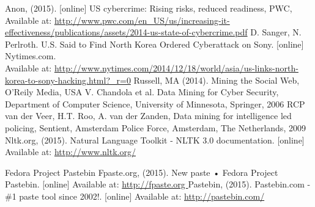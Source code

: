 \documentclass[12pt]{article}
\begin{document}
\begin{thebibliography}{99}
	Anon, (2015). [online] US cybercrime: Rising risks, reduced readiness, PWC, Available at: \url{http://www.pwc.com/en_US/us/increasing-it-effectiveness/publications/assets/2014-us-state-of-cybercrime.pdf}
	 D. Sanger, N. Perlroth.  U.S. Said to Find North Korea Ordered Cyberattack on Sony. [online] Nytimes.com. \\Available at: \url{http://www.nytimes.com/2014/12/18/world/asia/us-links-north-korea-to-sony-hacking.html?_r=0}
  Russell, MA (2014). Mining the Social Web, O'Reily Media, USA
    V. Chandola et al. Data Mining for Cyber Security, Department of Computer Science, University of Minnesota, Springer, 2006
   RCP van der Veer, H.T. Roo,  A. van der Zanden, Data mining for intelligence led policing, Sentient, Amsterdam Police Force, Amsterdam, The Netherlands, 2009
Nltk.org, (2015). Natural Language Toolkit - NLTK 3.0 documentation. [online] Available at: \url{http://www.nltk.org/}

Fedora Project Pastebin Fpaste.org, (2015). New paste • Fedora Project Pastebin. [online] Available at:  
\url{http://fpaste.org }
Pastebin, (2015). Pastebin.com - \#1 paste tool since 2002!. [online] Available at:     \url{http://pastebin.com/}


\end{thebibliography}
\end{document}
